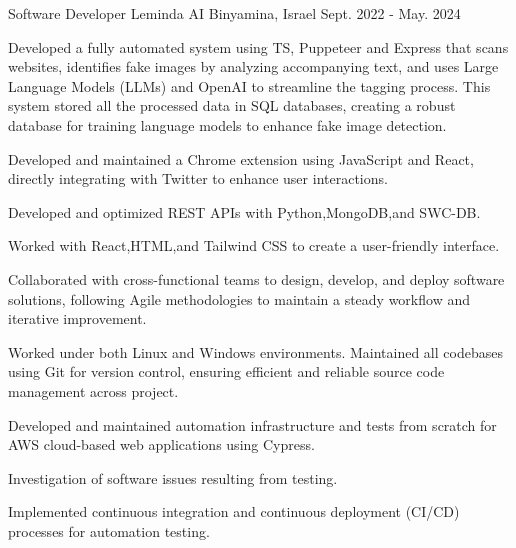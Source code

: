 

\begin{cventries}

  \cventry
    {Software Developer} %
    {Leminda AI} %
    {Binyamina, Israel} %
    {Sept. 2022 - May. 2024} %
    {
       \begin{cvitems}
          \item {Developed a fully automated system using TS, Puppeteer and Express that scans websites, identifies fake images by analyzing accompanying text, and uses Large Language
Models (LLMs) and OpenAI to streamline the tagging process. This system stored all the processed data in SQL databases, creating a robust
database for training language models to enhance fake image detection.}
          \item {Developed and maintained a Chrome extension using JavaScript and React, directly integrating with Twitter to enhance user interactions.}
          \item {Developed and optimized REST APIs with Python,MongoDB,and SWC-DB.}
          \item {Worked with React,HTML,and Tailwind CSS to create a user-friendly interface.}
          \item {Collaborated with cross-functional teams to design, develop, and deploy software solutions, following Agile methodologies to maintain a steady
workflow and iterative improvement.}
          \item {Worked under both Linux and Windows environments. Maintained all codebases using Git for version control, ensuring efficient and reliable
source code management across project.}
          \item {Developed and maintained automation infrastructure and tests from scratch for AWS cloud-based web applications using Cypress.}
          \item {Investigation of software issues resulting from testing.}
          \item {Implemented continuous integration and continuous deployment (CI/CD) processes for automation testing.}
        \end{cvitems}
    }


\end{cventries}

